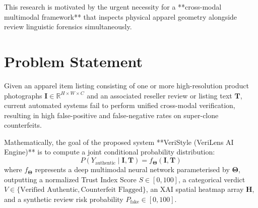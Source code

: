 This research is motivated by the urgent necessity for a **cross-modal multimodal framework** that inspects physical apparel geometry alongside review linguistic forensics simultaneously.

\section{Problem Statement}
Given an apparel item listing consisting of one or more high-resolution product photographs $\mathbf{I} \in \mathbb{R}^{H \times W \times C}$ and an associated reseller review or listing text $\mathbf{T}$, current automated systems fail to perform unified cross-modal verification, resulting in high false-positive and false-negative rates on super-clone counterfeits. 

Mathematically, the goal of the proposed system **VeriStyle (VeriLens AI Engine)** is to compute a joint conditional probability distribution:
\begin{equation}
    P(Y_{\text{authentic}} \mid \mathbf{I}, \mathbf{T}) = f_{\boldsymbol{\Theta}}(\mathbf{I}, \mathbf{T})
\end{equation}
where $f_{\boldsymbol{\Theta}}$ represents a deep multimodal neural network parameterised by $\boldsymbol{\Theta}$, outputting a normalized Trust Index Score $S \in [0, 100]$, a categorical verdict $V \in \{\text{Verified Authentic}, \text{Counterfeit Flagged}\}$, an XAI spatial heatmap array $\mathbf{H}$, and a synthetic review risk probability $P_{\text{fake}} \in [0, 100]$.

